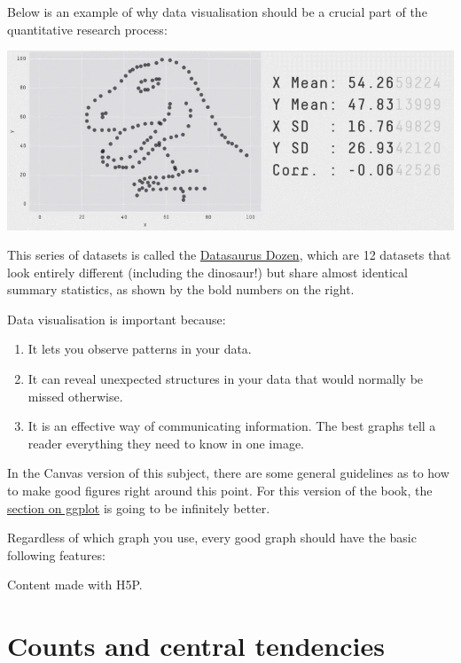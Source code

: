 \documentclass[
]{book}
\providecommand{\tightlist}{%
  \setlength{\itemsep}{0pt}\setlength{\parskip}{0pt}}
\begin{document}
Below is an example of why data visualisation should be a crucial part of the quantitative research process:

\includegraphics{img/datasaurus.gif}

This series of datasets is called the \href{https://www.research.autodesk.com/publications/same-stats-different-graphs/}{Datasaurus Dozen}, which are 12 datasets that look entirely different (including the dinosaur!) but share almost identical summary statistics, as shown by the bold numbers on the right.

Data visualisation is important because:

\begin{enumerate}
\def\labelenumi{\arabic{enumi}.}
\tightlist
\item
  It lets you observe patterns in your data.
\item
  It can reveal unexpected structures in your data that would normally be missed otherwise.
\item
  It is an effective way of communicating information. The best graphs tell a reader everything they need to know in one image.
\end{enumerate}

In the Canvas version of this subject, there are some general guidelines as to how to make good figures right around this point. For this version of the book, the \protect\hyperlink{ggplot}{section on ggplot} is going to be infinitely better.

Regardless of which graph you use, every good graph should have the basic following features:

Content made with H5P.

\hypertarget{counts-and-central-tendencies}{%
\section{Counts and central tendencies}\label{counts-and-central-tendencies}}
\end{document}

